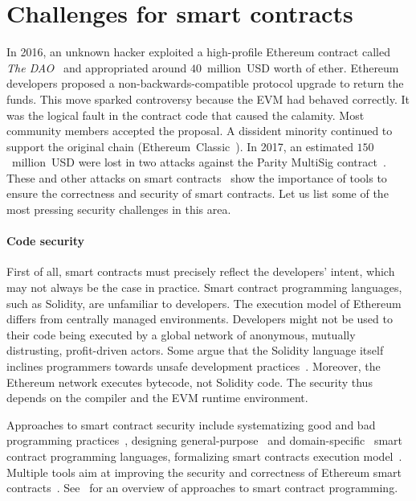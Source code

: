 \section{Challenges for smart contracts}

In 2016, an unknown hacker exploited a high-profile Ethereum contract called \textit{The DAO}~\cite{Sirer2016} and appropriated around $40$~million~USD worth of ether.
Ethereum developers proposed a non-backwards-compatible protocol upgrade to return the funds.
This move sparked controversy because the EVM had behaved correctly.
It was the logical fault in the contract code that caused the calamity.
Most community members accepted the proposal.
A dissident minority continued to support the original chain (Ethereum~Classic~\cite{EthereumClassic}).
In 2017, an estimated $150$~million~USD were lost in two attacks against the Parity MultiSig contract~\cite{Palladino2017}.
These and other attacks on smart contracts~\cite{Delmolino2016, Atzei2017} show the importance of tools to ensure the correctness and security of smart contracts.
Let us list some of the most pressing security challenges in this area.

\paragraph{Code security}
First of all, smart contracts must precisely reflect the developers' intent, which may not always be the case in practice.
Smart contract programming languages, such as Solidity, are unfamiliar to developers.
The execution model of Ethereum differs from centrally managed environments.
Developers might not be used to their code being executed by a global network of anonymous, mutually distrusting, profit-driven actors.
Some argue that the Solidity language itself inclines programmers towards unsafe development practices~\cite{ydtm2016}.
Moreover, the Ethereum network executes bytecode, not Solidity code.
The security thus depends on the compiler and the EVM runtime environment.

Approaches to smart contract security include systematizing good and bad programming practices~\cite{ConsenSys16, Chen2017}, designing general-purpose~\cite{Hirai2017a, Buterin2017b, Pettersson2016} and domain-specific~\cite{EgelundMueller2017} smart contract programming languages, formalizing smart contracts execution model~\cite{Sergey2017}.
Multiple tools aim at improving the security and correctness of Ethereum smart contracts~\cite{Bhargavan2016, Luu2016, Hirai2017, Hildenbrandt2018, Tsankov2018, Jiang2018, Slither, Manticore, Mythril, Echidna}.
See~\cite{Seijas2016} for an overview of approaches to smart contract programming.

